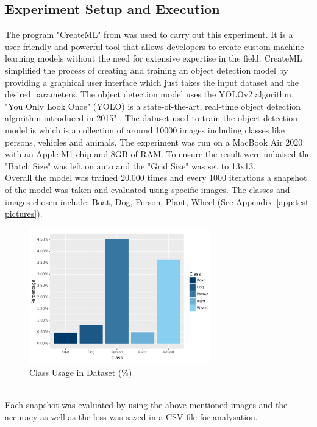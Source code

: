 \subsection{Experiment Setup and Execution}
The program "CreateML" from \cite{Apple} was used to carry out this experiment. It is a user-friendly and powerful 
tool that allows developers to create custom machine-learning models without the need for extensive expertise in the field.
CreateML simplified the process of creating and training an object detection model by providing a graphical user interface which 
just takes the input dataset and the desired parameters. The object detection model uses the YOLOv2 \parencite{Jaina} algorithm.
"You Only Look Once" (YOLO) is a state-of-the-art, real-time object detection algorithm introduced in 2015" \parencite{Keita2022}. 
The dataset used to train the object detection model is  which is a collection of around 10000 images including classes
like persons, vehicles and animals. The experiment was run on a MacBook Air 2020 with an Apple M1 chip and 8GB of RAM. To ensure the 
result were unbaised the "Batch Size" was left on auto and the "Grid Size" was set to 13x13.\\

\newpage
Overall the model was trained 20.000 times and every 1000 iterations a snapshot of the model was taken and evaluated using
specific images. 
The classes and images chosen include: Boat, Dog, Person, Plant, Wheel (See Appendix~\ref{app:test-pictures}).
\begin{figure}[h]
  \centering
  \includegraphics[width=0.70\textwidth]{../Data/distribution-classes-barchart.png}
  \caption{Class Usage in Dataset (\%)}
  \label{fig:class-usage-in-dataset}
\end{figure}
\\
Each snapshot was evaluated by using the above-mentioned images and the accuracy as well as the loss was saved in a CSV file for 
analysation.
\\
